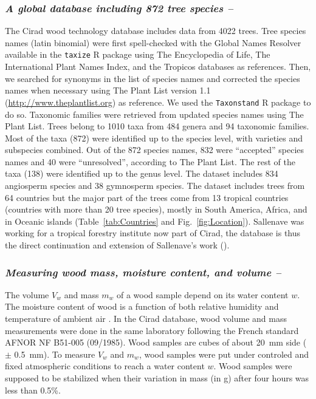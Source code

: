 \documentclass[a4paper, 12pt, leqno, dvipsnames]{article}\usepackage[]{graphicx}\usepackage[]{color}
\begin{document}
\subsubsection*{\textnormal{\textit{A global database including 872 tree species --}}}

The Cirad wood technology database includes data from 4022 trees. Tree species names (latin binomial) were first spell-checked with the Global Names Resolver available in the \texttt{taxize} R package \citep{Chamberlain2013} using The Encyclopedia of Life, The International Plant Names Index, and the Tropicos databases as references. Then, we searched for synonyms in the list of species names and corrected the species names when necessary using The Plant List version 1.1 (\url{http://www.theplantlist.org}) as reference. We used the \texttt{Taxonstand} R package \citep{Cayuela2017} to do so. Taxonomic families were retrieved from updated species names using The Plant List. Trees belong to 1010 taxa from 484 genera and 94 taxonomic families. Most of the taxa (872) were identified up to the species level, with varieties and subspecies combined. Out of the 872 species names, 832 were ``accepted'' species names and 40 were ``unresolved'', according to The Plant List. The rest of the taxa (138) were identified up to the genus level. The dataset includes 834 angiosperm species and 38 gymnosperm species. The dataset includes trees from 64 countries but the major part of the trees come from 13 tropical countries (countries with more than 20 tree species), mostly in South America, Africa, and in Oceanic islands (Table~\ref{tab:Countries} and Fig.~\ref{fig:Location}). Sallenave was working for a tropical forestry institute now part of Cirad, the database is thus the direct continuation and extension of Sallenave's work (\citeyear{Sallenave1955, Sallenave1964, Sallenave1971}).

\subsubsection*{\textnormal{\textit{Measuring wood mass, moisture content, and volume --}}}
\label{seq:mass-volume}

The volume $V_w$ and mass $m_w$ of a wood sample depend on its water content $w$. The moisture content of wood is a function of both relative humidity and temperature of ambient air \citep{Hailwood1946, Glass2010}. In the Cirad database, wood volume and mass measurements were done in the same laboratory following the French standard AFNOR NF B51-005 (09/1985). Wood samples are cubes of about 20~mm side ($\pm$ 0.5~mm). To measure $V_w$ and $m_w$, wood samples were put under controled and fixed atmospheric conditions to reach a water content $w$. Wood samples were supposed to be stabilized when their variation in mass (in g) after four hours was less than 0.5\%.
\end{document}
